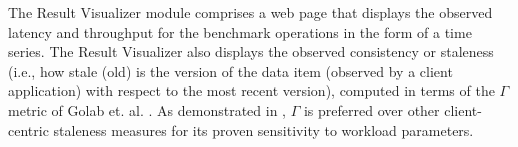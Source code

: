 \documentclass[conference]{IEEEtran}
\begin{document}
The Result Visualizer module comprises a web page that displays the observed latency and throughput for the benchmark operations in the form of a time series.
    The Result Visualizer also displays the observed consistency or staleness (i.e., how stale (old) is the version of
 the data item (observed by a client application) with respect to the most recent version), computed in terms of the {\boldmath$\Gamma$} metric of Golab et. al. \cite{DBLP:conf/cloud/GolabRAKWG13}. As demonstrated in \cite{DBLP:conf/cloud/GolabRAKWG13}, {\boldmath$\Gamma$}  is preferred over other client-centric staleness measures for its proven sensitivity to workload parameters.
\end{document}
